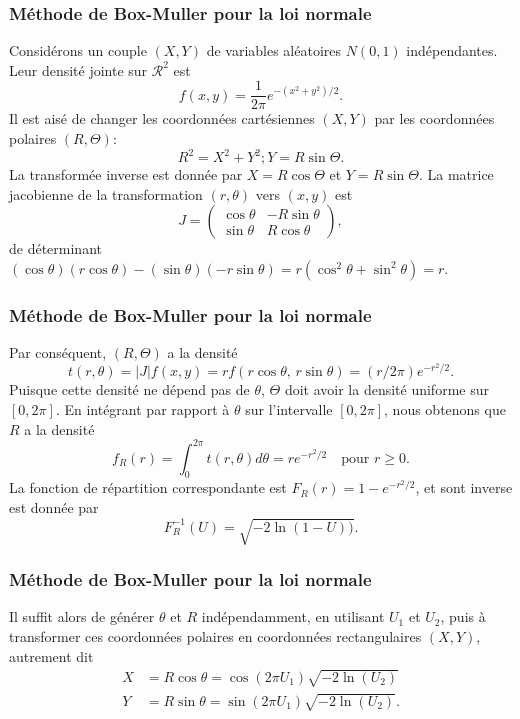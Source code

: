 \documentclass[t,usepdftitle=false]{beamer}
\def\RR{\mathcal{R}}
\begin{document}
\begin{frame}
\frametitle{Méthode de Box-Muller pour la loi normale}

Considérons un couple $(X,Y)$ de variables aléatoires $N(0,1)$ indépendantes. Leur densité jointe sur $\RR^2$ est
\[
f (x, y ) = \frac{1}{2\pi} e^{-(x^2 +y^2 )/2}.
\]
Il est aisé de changer les coordonnées cartésiennes $(X,Y)$ par les coordonnées polaires $(R, \Theta)$:\\
\[
R^2 = X^2 + Y^2 ; Y = R \sin \Theta.
\]
La transformée inverse est donnée par
$X = R \cos\Theta$ et $Y = R \sin \Theta$.
La matrice jacobienne de la transformation $(r,\theta)$ vers $(x,y)$ est
\[
J = \begin{pmatrix} \cos \theta & -R \sin \theta \\ \sin \theta & R
  \cos \theta \end{pmatrix},
\]
de déterminant
$(\cos\theta)(r\cos\theta) - (\sin\theta)(-r\sin\theta) 
= r(\cos^2\theta+\sin^2\theta) = r$.

\end{frame}

\begin{frame}
\frametitle{Méthode de Box-Muller pour la loi normale}

Par conséquent, $(R,\Theta)$ a la densité
\[
t(r,\theta) = |J| f(x,y) =  r f(r \cos\theta,\, r \sin\theta) =
(r/2\pi) e^{-r^2/2}.
\]
Puisque cette densité ne dépend pas de $\theta$,
$\Theta$ doit avoir la densité uniforme sur $[0,2\pi]$.
En intégrant par rapport à $\theta$ sur l'intervalle $[0,2\pi]$,
nous obtenons que $R$ a la densité
\[
  f_R(r) = \int_0^{2\pi} t(r,\theta) d\theta = r e^{-r^2/2} \quad
  \mbox{pour } r\ge 0.
\]
La fonction de répartition correspondante est $F_R(r) = 1-e^{-r^2/2}$,
et sont inverse est donnée par
\[
  F_R^{-1}(U) = \sqrt{-2 \ln (1-U))}.
\]

\end{frame}

\begin{frame}
\frametitle{Méthode de Box-Muller pour la loi normale}

Il suffit alors de générer $\theta$ et $R$ indépendamment, en
utilisant $U_1$ et $U_2$, puis à transformer ces coordonnées polaires
en coordonnées rectangulaires $(X, Y )$, autrement dit
\begin{align*}
 X & = R \cos \theta = \cos(2 \pi U_1) \sqrt{ -2 \ln(U_2) } \\
 Y & = R \sin \theta = \sin(2 \pi U_1) \sqrt{ -2 \ln(U_2) }.
\end{align*}

\end{frame}
\end{document}
